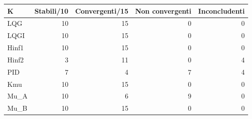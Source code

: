 \begin{center}\small\begin{tabular}{lrrrr}\toprule
K & Stabili/10 & Convergenti/15 & Non convergenti & Inconcludenti\\\midrule
LQG & 10 & 15 & 0 & 0\\
LQGI & 10 & 15 & 0 & 0\\
Hinf1 & 10 & 15 & 0 & 0\\
Hinf2 & 3 & 11 & 0 & 4\\
PID & 7 & 4 & 7 & 4\\
Kmu & 10 & 15 & 0 & 0\\
Mu\_A & 10 & 6 & 9 & 0\\
Mu\_B & 10 & 15 & 0 & 0\\
\bottomrule\end{tabular}
\end{center}
